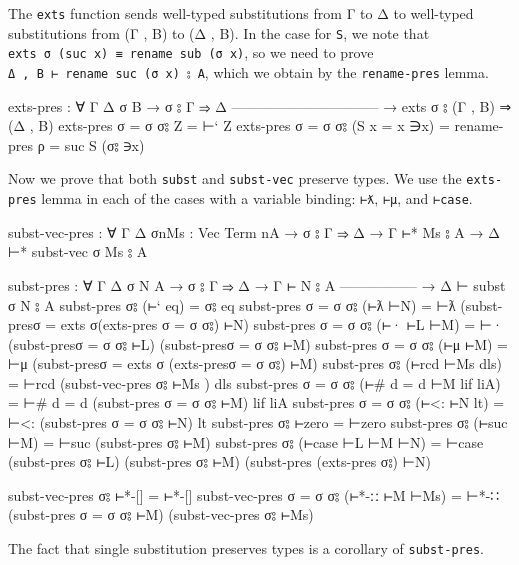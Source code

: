 The \texttt{exts} function sends well-typed substitutions from Γ to Δ to
well-typed substitutions from (Γ , B) to (Δ , B). In the case for
\texttt{S}, we note that
\texttt{exts\ σ\ (suc\ x)\ ≡\ rename\ sub\ (σ\ x)}, so we need to prove
\texttt{Δ\ ,\ B\ ⊢\ rename\ suc\ (σ\ x)\ ⦂\ A}, which we obtain by the
\texttt{rename-pres} lemma.

\begin{fence}
\begin{code}
exts-pres : ∀ {Γ Δ σ B}
  → σ ⦂ Γ ⇒ Δ
    --------------------------------
  → exts σ ⦂ (Γ , B) ⇒ (Δ , B)
exts-pres {σ = σ} σ⦂ Z = ⊢` Z
exts-pres {σ = σ} σ⦂ (S {x = x} ∋x) = rename-pres {ρ = suc} S (σ⦂ ∋x)
\end{code}
\end{fence}

Now we prove that both \texttt{subst} and \texttt{subst-vec} preserve
types. We use the \texttt{exts-pres} lemma in each of the cases with a
variable binding: \texttt{⊢ƛ}, \texttt{⊢μ}, and \texttt{⊢case}.

\begin{fence}
\begin{code}
subst-vec-pres : ∀ {Γ Δ σ}{n}{Ms : Vec Term n}{A}
  → σ ⦂ Γ ⇒ Δ  →  Γ ⊢* Ms ⦂ A  →  Δ ⊢* subst-vec σ Ms ⦂ A

subst-pres : ∀ {Γ Δ σ N A}
  → σ ⦂ Γ ⇒ Δ
  → Γ ⊢ N ⦂ A
    -----------------
  → Δ ⊢ subst σ N ⦂ A
subst-pres σ⦂ (⊢` eq)            = σ⦂ eq
subst-pres {σ = σ} σ⦂ (⊢ƛ ⊢N)    = ⊢ƛ (subst-pres{σ = exts σ}(exts-pres {σ = σ} σ⦂) ⊢N)
subst-pres {σ = σ} σ⦂ (⊢· ⊢L ⊢M) = ⊢· (subst-pres{σ = σ} σ⦂ ⊢L) (subst-pres{σ = σ} σ⦂ ⊢M)
subst-pres {σ = σ} σ⦂ (⊢μ ⊢M)    = ⊢μ (subst-pres{σ = exts σ} (exts-pres{σ = σ} σ⦂) ⊢M)
subst-pres σ⦂ (⊢rcd ⊢Ms dls) = ⊢rcd (subst-vec-pres σ⦂ ⊢Ms ) dls
subst-pres {σ = σ} σ⦂ (⊢# {d = d} ⊢M lif liA) =
    ⊢# {d = d} (subst-pres {σ = σ} σ⦂ ⊢M) lif liA
subst-pres {σ = σ} σ⦂ (⊢<: ⊢N lt) = ⊢<: (subst-pres {σ = σ} σ⦂ ⊢N) lt
subst-pres σ⦂ ⊢zero = ⊢zero
subst-pres σ⦂ (⊢suc ⊢M) = ⊢suc (subst-pres σ⦂ ⊢M)
subst-pres σ⦂ (⊢case ⊢L ⊢M ⊢N) =
    ⊢case (subst-pres σ⦂ ⊢L) (subst-pres σ⦂ ⊢M) (subst-pres (exts-pres σ⦂) ⊢N)

subst-vec-pres σ⦂ ⊢*-[] = ⊢*-[]
subst-vec-pres {σ = σ} σ⦂ (⊢*-∷ ⊢M ⊢Ms) =
    ⊢*-∷ (subst-pres {σ = σ} σ⦂ ⊢M) (subst-vec-pres σ⦂ ⊢Ms)
\end{code}
\end{fence}

The fact that single substitution preserves types is a corollary of
\texttt{subst-pres}.

